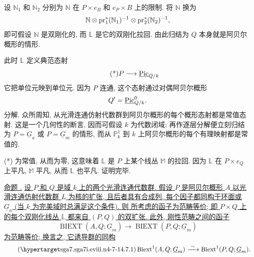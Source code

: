 设 $\mathbb N_1$ 和 $\mathbb N_2$ 分别为 $\mathbb
N$ 在 $P\times e_B$ 和 $e_P\times B$ 上的限制. 将 $\mathbb N$ 换为
\[
 \mathbb N\otimes\operatorname{pr}_1^*(\mathbb N_1)^{-1}
 \otimes\operatorname{pr}_2^*(\mathbb N_2)^{-1},
\]
即可假设 $\mathbb N$ 是双刚化的, 而 $\mathbb L$ 是它的双刚化拉回. 由此归结为 $Q$ 本身就是阿贝尔概形的情形.

此时 $\mathbb L$ 定义典范态射
\begin{equation}\tag{*}
 P\longrightarrow\underline{\Pic}_{Q/k}
\end{equation}
它把单位元映到单位元. 因为 $P$ 连通, 这个态射通过对偶阿贝尔概形
\[
 Q'=\underline{\Pic}^{0}_{Q/k}.
\]
分解. 众所周知, 从光滑连通仿射代数群到阿贝尔概形的每个概形态射都是常值态射. 这是一个几何性的断言, 因而可假设 $k$ 为代数闭域; 再作逐层分解便立刻归结为 $P=\underline
G_a$ 或 $P=\underline G_m$ 的情形, 而从 $\mathbb P^1_k$ 到 $k$ 上阿贝尔概形的每个有理映射都是常值的.

(*) 为常值, 从而为零, 这意味着 $\mathbb L$ 是 $P$ 上某个线丛 $\mathbb M$ 的拉回. 因为 $\mathbb L$ 在 $P\times e_Q$ 上平凡, $\mathbb M$ 平凡, 从而 $\mathbb L$ 也平凡. 证明完毕.




\medskip
\noindent\underline{命题 .} \underline{设 $P$ 和 $Q$ 是域 $k$ 上的两个光滑连通代数群. 假设 $P$ 是阿贝尔概形 $A$ 以光滑连通仿射代数群 $L$ 为核的扩张, 且后者具有合成列, 每个因子都同构于环面或 $\underline
G_a$ (当 $k$ 为完美域时总满足这个条件). 则  所考虑的函子为范畴等价; 即 $P\times Q$ 上的每个双刚化线丛 $\mathbb L$ 都来自 $(P,Q)$ 的双扩张. 此外, 刚性范畴之间的函子}
\[
 \operatorname{BIEXT}(A,Q;\underline G_m)
 \longrightarrow
 \operatorname{BIEXT}(P,Q;\underline G_m)
\]
\underline{为范畴等价; 换言之, 它诱导群的同构}
\begin{equation}\tag{\SGARefTarget{sga7.sga7i.eviii.n4-7-1}{4.7.1}}
 \Biext^1(A,Q;\underline G_m)
 \xrightarrow{\ \sim\ }
 \Biext^1(P,Q;\underline G_m).
\end{equation}

